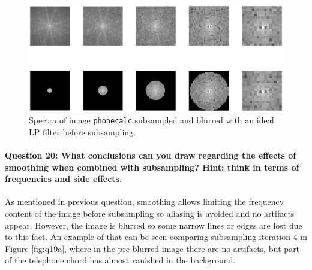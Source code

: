 \documentclass[12pt]{article}
\begin{document}
\begin{figure}[htbp]
 \centering
 \includegraphics[width=\textwidth]{q19d}
 \caption{Spectra of image \texttt{phonecalc} subsampled and blurred with an ideal LP filter before subsampling.}
 \label{fig:q19d}
\end{figure}

\paragraph{Question 20: What conclusions can you draw regarding the effects of smoothing when combined with subsampling? Hint: think in terms of frequencies and side effects.}

As mentioned in previous question, smoothing allows limiting the frequency content of the image before subsampling so aliasing is avoided and no artifacts appear. However, the image is blurred so some narrow lines or edges are lost due to this fact. An example of that can be seen comparing subsampling iteration 4 in Figure \ref{fig:q19a}, where in the pre-blurred image there are no artifacts, but part of the telephone chord has almost vanished in the background.

%
%
\end{document}
